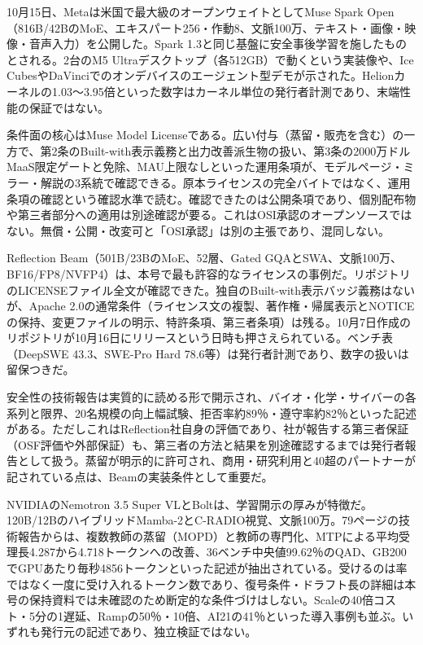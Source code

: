 \documentclass[lualatex,a4paper,10pt]{jlreq}
\begin{document}
10月15日、Metaは米国で最大級のオープンウェイトとしてMuse Spark Open（816B/42BのMoE、エキスパート256・作動8、文脈100万、テキスト・画像・映像・音声入力）を公開した。Spark 1.3と同じ基盤に安全事後学習を施したものとされる。2台のM5 Ultraデスクトップ（各512GB）で動くという実装像や、Ice CubesやDaVinciでのオンデバイスのエージェント型デモが示された。Helionカーネルの1.03〜3.95倍といった数字はカーネル単位の発行者計測であり、末端性能の保証ではない。
\cite{B13,B14,B15}


条件面の核心はMuse Model Licenseである。広い付与（蒸留・販売を含む）の一方で、第2条のBuilt-with表示義務と出力改善派生物の扱い、第3条の2000万ドルMaaS限定ゲートと免除、MAU上限なしといった運用条項が、モデルページ・ミラー・解説の3系統で確認できる。原本ライセンスの完全バイトではなく、運用条項の確認という確認水準で読む。確認できたのは公開条項であり、個別配布物や第三者部分への適用は別途確認が要る。これはOSI承認のオープンソースではない。無償・公開・改変可と「OSI承認」は別の主張であり、混同しない。
\cite{B13,B14,B15}


Reflection Beam（501B/23BのMoE、52層、Gated GQAとSWA、文脈100万、BF16/FP8/NVFP4）は、本号で最も許容的なライセンスの事例だ。リポジトリのLICENSEファイル全文が確認できた。独自のBuilt-with表示バッジ義務はないが、Apache 2.0の通常条件（ライセンス文の複製、著作権・帰属表示とNOTICEの保持、変更ファイルの明示、特許条項、第三者条項）は残る。10月7日作成のリポジトリが10月16日にリリースという日時も押さえられている。ベンチ表（DeepSWE 43.3、SWE-Pro Hard 78.6等）は発行者計測であり、数字の扱いは留保つきだ。
\cite{B16,B17,B18,B19}


安全性の技術報告は実質的に読める形で開示され、バイオ・化学・サイバーの各系列と限界、20名規模の向上幅試験、拒否率約89％・遵守率約82％といった記述がある。ただしこれはReflection社自身の評価であり、社が報告する第三者保証（OSF評価や外部保証）も、第三者の方法と結果を別途確認するまでは発行者報告として扱う。蒸留が明示的に許可され、商用・研究利用と40超のパートナーが記されている点は、Beamの実装条件として重要だ。
\cite{B16,B17,B18,B19}


NVIDIAのNemotron 3.5 Super VLとBoltは、学習開示の厚みが特徴だ。120B/12BのハイブリッドMamba-2とC-RADIO視覚、文脈100万。79ページの技術報告からは、複数教師の蒸留（MOPD）と教師の専門化、MTPによる平均受理長4.287から4.718トークンへの改善、36ベンチ中央値99.62％のQAD、GB200でGPUあたり毎秒4856トークンといった記述が抽出されている。受けるのは率ではなく一度に受け入れるトークン数であり、復号条件・ドラフト長の詳細は本号の保持資料では未確認のため断定的な条件づけはしない。Scaleの40倍コスト・5分の1遅延、Rampの50％・10倍、AI21の41％といった導入事例も並ぶ。いずれも発行元の記述であり、独立検証ではない。
\cite{B20,B21,B22}
\end{document}
